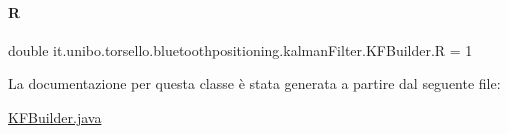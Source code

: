 \hypertarget{classit_1_1unibo_1_1torsello_1_1bluetoothpositioning_1_1kalmanFilter_1_1KFBuilder_a7937e1ec71fbede97b0bd70ead2e30dd_a7937e1ec71fbede97b0bd70ead2e30dd}{}\label{classit_1_1unibo_1_1torsello_1_1bluetoothpositioning_1_1kalmanFilter_1_1KFBuilder_a7937e1ec71fbede97b0bd70ead2e30dd_a7937e1ec71fbede97b0bd70ead2e30dd} 
\paragraph{\texorpdfstring{R}{R}}
{\footnotesize\ttfamily double it.\+unibo.\+torsello.\+bluetoothpositioning.\+kalman\+Filter.\+K\+F\+Builder.\+R = 1\hspace{0.3cm}{\ttfamily [private]}}



La documentazione per questa classe è stata generata a partire dal seguente file\+:\begin{DoxyCompactItemize}
\item 
\hyperlink{KFBuilder_8java}{K\+F\+Builder.\+java}\end{DoxyCompactItemize}

